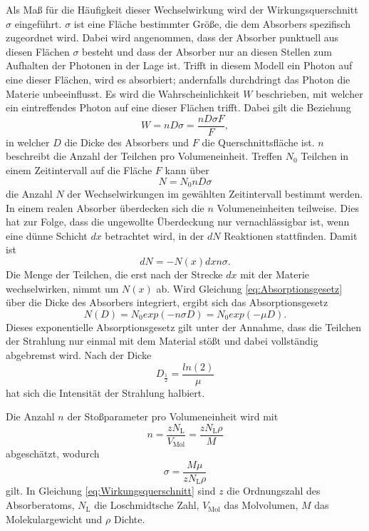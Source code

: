 Als Maß für die Häufigkeit dieser Wechselwirkung wird der Wirkungsquerschnitt $\sigma$ eingeführt.
$\sigma$ ist eine Fläche bestimmter Größe, die dem Absorbers spezifisch zugeordnet wird. 
Dabei wird angenommen, dass der Absorber punktuell aus diesen Flächen $\sigma$ besteht und dass der Absorber nur an diesen Stellen zum Aufhalten der Photonen in der Lage ist.
Trifft in diesem Modell ein Photon auf eine dieser Flächen, wird es absorbiert; andernfalls durchdringt das Photon die Materie unbeeinflusst.
Es wird die Wahrscheinlichkeit $W$ beschrieben, mit welcher ein eintreffendes Photon auf eine dieser Flächen trifft. 
Dabei gilt die Beziehung 
\begin{equation}
	W=n D \sigma =\frac{n D \sigma F}{F},
\end{equation}
in welcher $D$ die Dicke des Absorbers und $F$ die Querschnittsfläche ist. 
$n$ beschreibt die Anzahl der Teilchen pro Volumeneinheit.
Treffen $N_0$ Teilchen in einem Zeitintervall auf die Fläche $F$ kann über
\begin{equation}
	N=N_0 n D \sigma
\end{equation}
die Anzahl $N$ der Wechselwirkungen im gewählten Zeitintervall bestimmt werden. 
In einem realen Absorber überdecken sich die $n$ Volumeneinheiten teilweise. 
Dies hat zur Folge, dass die ungewollte Überdeckung nur vernachlässigbar ist, wenn eine dünne Schicht $dx$ betrachtet wird, in der $dN$ Reaktionen stattfinden. 
Damit ist
\begin{equation}
	dN=-N(x) dx n \sigma.
	\label{eq:Absorptionsgesetz_Vorstufe}
\end{equation}
Die Menge der Teilchen, die erst nach der Strecke $dx$ mit der Materie wechselwirken, nimmt um $N(x)$ ab. 
Wird Gleichung \eqref{eq:Absorptionsgesetz} über die Dicke des Absorbers integriert, ergibt sich das Absorptionsgesetz
\begin{equation}
	N(D)=N_0 exp(-n \sigma D)=N_0 exp(-\mu D).
	\label{eq:Absorptionsgesetz}
\end{equation}
Dieses exponentielle Absorptionsgesetz gilt unter der Annahme, dass die Teilchen der Strahlung nur einmal mit dem Material stößt und dabei vollständig abgebremst wird.
Nach der Dicke
\begin{equation}
D_\frac{1}{2}=\frac{ln(2)}{\mu}
\end{equation}
hat sich die Intensität der Strahlung halbiert.

Die Anzahl $n$ der Stoßparameter pro Volumeneinheit wird mit
\begin{equation}
	n=\frac{zN_\text{L}}{V_\text{Mol}}=\frac{zN_\text{L}\rho}{M}
\end{equation}
abgeschätzt, wodurch 
\begin{equation}
	\sigma=\frac{M\mu}{zN_\text{L}\rho}
	\label{eq:Wirkungsquerschnitt}
\end{equation}
gilt.
In Gleichung \ref{eq:Wirkungsquerschnitt} sind $z$ die Ordnungszahl des Absorberatoms, $N_\text{L}$ die Loschmidtsche Zahl, $V_\text{Mol}$ das Molvolumen, $M$ das Molekulargewicht und $\rho$ Dichte.



